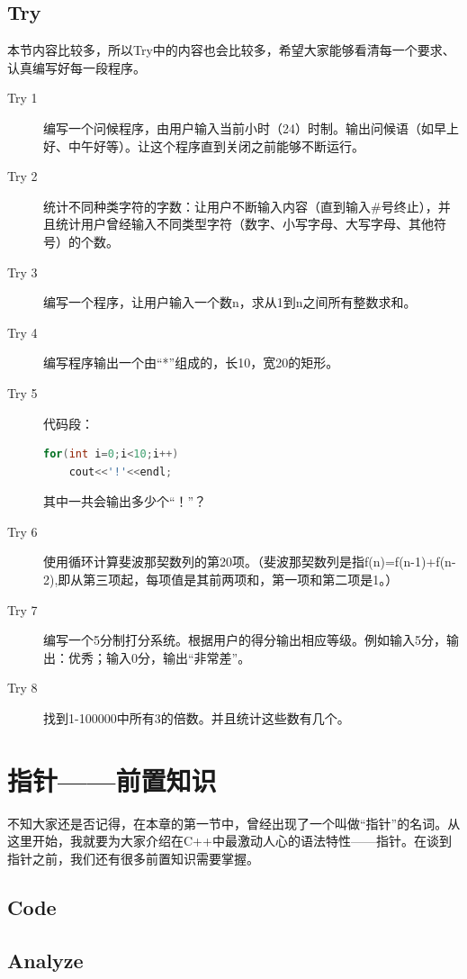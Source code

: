 \subsection{Try}
本节内容比较多，所以Try中的内容也会比较多，希望大家能够看清每一个要求、认真编写好每一段程序。
\begin{description}
	\item[Try 1]编写一个问候程序，由用户输入当前小时（24）时制。输出问候语（如早上好、中午好等）。让这个程序直到关闭之前能够不断运行。
	\item[Try 2]统计不同种类字符的字数：让用户不断输入内容（直到输入\#号终止），并且统计用户曾经输入不同类型字符（数字、小写字母、大写字母、其他符号）的个数。
	\item[Try 3]编写一个程序，让用户输入一个数n，求从1到n之间所有整数求和。
	\item[Try 4]编写程序输出一个由“*”组成的，长10，宽20的矩形。
	\item[Try 5]代码段：
		\begin{lstlisting}[language=c++,xrightmargin=20em]
for(int i=0;i<10;i++)
    cout<<'!'<<endl;
		\end{lstlisting}
		其中一共会输出多少个“！”？
	\item[Try 6]使用循环计算斐波那契数列的第20项。（斐波那契数列是指f(n)=f(n-1)+f(n-2),即从第三项起，每项值是其前两项和，第一项和第二项是1。）
	\item[Try 7]编写一个5分制打分系统。根据用户的得分输出相应等级。例如输入5分，输出：优秀；输入0分，输出“非常差”。
	\item[Try 8]找到1-100000中所有3的倍数。并且统计这些数有几个。
\end{description}

\section{指针——前置知识}
不知大家还是否记得，在本章的第一节中，曾经出现了一个叫做“指针”的名词。从这里开始，我就要为大家介绍在C++中最激动人心的语法特性——指针。在谈到指针之前，我们还有很多前置知识需要掌握。



\subsection{Code}

\subsection{Analyze}

